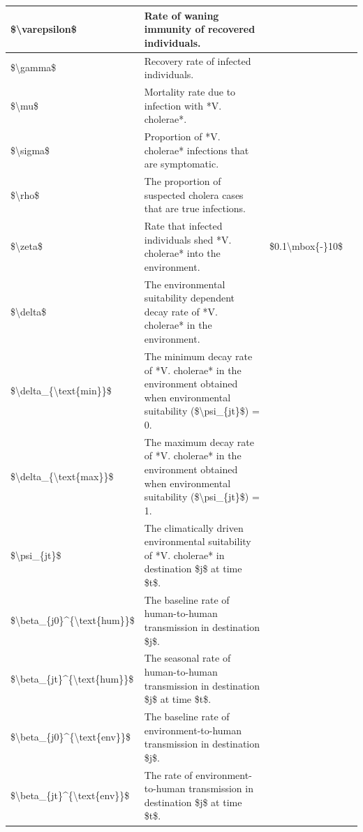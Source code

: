 \documentclass[
]{book}
\begin{document}
\begin{table}
\begin{tabular}[t]{l|l|l|l}
\hline
\$\textbackslash{}varepsilon\$ & Rate of waning immunity of recovered individuals. &  & \\
\hline
\$\textbackslash{}gamma\$ & Recovery rate of infected individuals. &  & \\
\hline
\$\textbackslash{}mu\$ & Mortality rate due to infection with *V. cholerae*. &  & \\
\hline
\$\textbackslash{}sigma\$ & Proportion of *V. cholerae* infections that are symptomatic. &  & \\
\hline
\$\textbackslash{}rho\$ & The proportion of suspected cholera cases that are true infections. &  & \\
\hline
\$\textbackslash{}zeta\$ & Rate that infected individuals shed *V. cholerae* into the environment. & \$0.1\textbackslash{}mbox\{-\}10\$ & \\
\hline
\$\textbackslash{}delta\$ & The environmental suitability dependent decay rate of *V. cholerae* in the environment. &  & \\
\hline
\$\textbackslash{}delta\_\{\textbackslash{}text\{min\}\}\$ & The minimum decay rate of *V. cholerae* in the environment obtained when environmental suitability (\$\textbackslash{}psi\_\{jt\}\$) = 0. &  & \\
\hline
\$\textbackslash{}delta\_\{\textbackslash{}text\{max\}\}\$ & The maximum decay rate of *V. cholerae* in the environment obtained when environmental suitability  (\$\textbackslash{}psi\_\{jt\}\$) = 1. &  & \\
\hline
\$\textbackslash{}psi\_\{jt\}\$ & The climatically driven environmental suitability of *V. cholerae* in destination \$j\$ at time \$t\$. &  & \\
\hline
\$\textbackslash{}beta\_\{j0\}\textasciicircum{}\{\textbackslash{}text\{hum\}\}\$ & The baseline rate of human-to-human transmission in destination \$j\$. &  & \\
\hline
\$\textbackslash{}beta\_\{jt\}\textasciicircum{}\{\textbackslash{}text\{hum\}\}\$ & The seasonal rate of human-to-human transmission in destination \$j\$ at time \$t\$. &  & \\
\hline
\$\textbackslash{}beta\_\{j0\}\textasciicircum{}\{\textbackslash{}text\{env\}\}\$ & The baseline rate of environment-to-human transmission in destination \$j\$. &  & \\
\hline
\$\textbackslash{}beta\_\{jt\}\textasciicircum{}\{\textbackslash{}text\{env\}\}\$ & The rate of environment-to-human transmission in destination \$j\$ at time \$t\$. &  & \\

\end{tabular}
\end{table}
\end{document}
